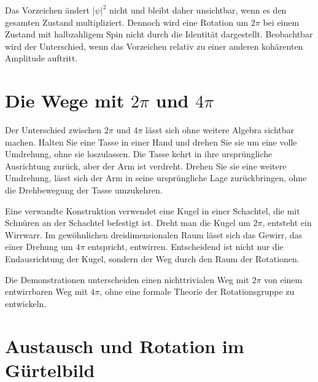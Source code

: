 Das Vorzeichen ändert \(\lvert\psi\rvert^2\) nicht und bleibt daher unsichtbar, wenn es den gesamten Zustand multipliziert. Dennoch wird eine Rotation um \(2\pi\) bei einem Zustand mit halbzahligem Spin nicht durch die Identität dargestellt. Beobachtbar wird der Unterschied, wenn das Vorzeichen relativ zu einer anderen kohärenten Amplitude auftritt.

\section{Die Wege mit \texorpdfstring{\(2\pi\) und \(4\pi\)}{2 pi und 4 pi}}

Der Unterschied zwischen \(2\pi\) und \(4\pi\) lässt sich ohne weitere Algebra sichtbar machen. Halten Sie eine Tasse in einer Hand und drehen Sie sie um eine volle Umdrehung, ohne sie loszulassen. Die Tasse kehrt in ihre ursprüngliche Ausrichtung zurück, aber der Arm ist verdreht. Drehen Sie sie eine weitere Umdrehung, lässt sich der Arm in seine ursprüngliche Lage zurückbringen, ohne die Drehbewegung der Tasse umzukehren.

Eine verwandte Konstruktion verwendet eine Kugel in einer Schachtel, die mit Schnüren an der Schachtel befestigt ist. Dreht man die Kugel um \(2\pi\), entsteht ein Wirrwarr. Im gewöhnlichen dreidimensionalen Raum lässt sich das Gewirr, das einer Drehung um \(4\pi\) entspricht, entwirren. Entscheidend ist nicht nur die Endausrichtung der Kugel, sondern der Weg durch den Raum der Rotationen.

\begin{classroomqa}
\end{classroomqa}

Die Demonstrationen unterscheiden einen nichttrivialen Weg mit \(2\pi\) von einem entwirrbaren Weg mit \(4\pi\), ohne eine formale Theorie der Rotationsgruppe zu entwickeln.

\section{Austausch und Rotation im Gürtelbild}

